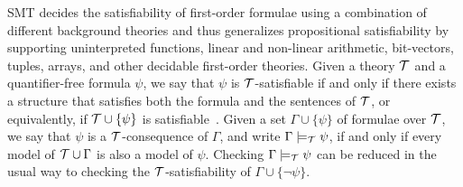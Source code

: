 \documentclass[conference]{IEEEtran}
\begin{document}
\smallskip{}
%
SMT decides the satisfiability of first-order formulae using a
combination of different background theories and thus generalizes
propositional satisfiability by supporting uninterpreted functions,
linear and non-linear arithmetic, bit-vectors, tuples, arrays, and other
decidable first-order theories. Given a theory ${\cal T}$ and a
quantifier-free formula $\psi$, we say that $\psi$ is $\cal
T$-satisfiable if and only if there exists a structure that satisfies
both the formula and the sentences of ${\cal T}$, or equivalently, if
${\cal T}\cup \{\psi\}$ is satisfiable~\cite{Bradley07}. Given a set
$\Gamma\cup \{\psi\}$ of formulae over $\cal T$, we say that $\psi$ is a
$\cal T$-consequence of $\Gamma$, and write $\Gamma\models_{\cal
T}\psi$, if and only if every model of ${\cal T}\cup\Gamma$ is also a
model of $\psi$.  Checking $\Gamma\models_{\cal T}\psi$ can be reduced
in the usual way to checking the $\cal T$-satisfiability of
$\Gamma\cup\{\neg\psi\}$.
\end{document}
